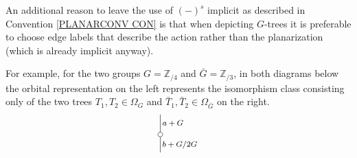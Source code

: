 \documentclass[a4paper,10pt]{article}%
\begin{document}
\begin{example}
An additional reason to leave the use of $(\minus)^s$ implicit
as described in Convention \ref{PLANARCONV CON} is that when depicting $G$-trees it is preferable to choose edge labels that describe the action rather than the planarization (which is already implicit anyway).

For example, for the two groups 
$G = \mathbb{Z}_{/4}$ and 
$\bar{G} = \mathbb{Z}_{/3}$, in both diagrams below the orbital representation on the left represents the isomorphism class consisting only of the two trees 
$T_1,T_2 \in \Omega_G$ and
$\bar{T}_1,\bar{T}_2 \in \Omega_{\bar{G}}$
on the right.
\[
	\begin{tikzpicture}[grow=up,auto,level distance=2.1em,
	every node/.style = {font=\footnotesize,inner sep=2pt},
	dummy/.style={circle,draw,inner sep=0pt,minimum size=1.75mm}]
%
		\node at (-1,-2) {}
			child{node [dummy] {}
				child[sibling distance=1.75em]{
				edge from parent node [swap]  {$a+G$}}
			edge from parent node [swap] {$b+G/2G$}};

\end{tikzpicture}\]
\end{example}
\end{document}

